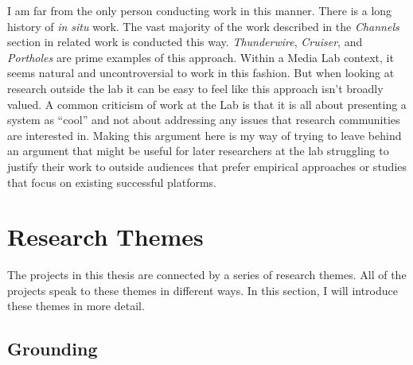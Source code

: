 % 




I am far from the only person conducting work in this manner. There is a long history of \emph{in situ} work. The vast majority of the work described in the \emph{Channels} section in related work is conducted this way. \emph{Thunderwire}, \emph{Cruiser}, and \emph{Portholes} are prime examples of this approach. Within a Media Lab context, it seems natural and uncontroversial to work in this fashion. But when looking at research outside the lab it can be easy to feel like this approach isn't broadly valued. A common criticism of work at the Lab is that it is all about presenting a system as ``cool'' and not about addressing any issues that research communities are interested in. Making this argument here is my way of trying to leave behind an argument that might be useful for later researchers at the lab struggling to justify their work to outside audiences that prefer empirical approaches or studies that focus on existing successful platforms.


\section{Research Themes}

The projects in this thesis are connected by a series of research themes. All of the projects speak to these themes in different ways. In this section, I will introduce these themes in more detail.

\subsection{Grounding}

